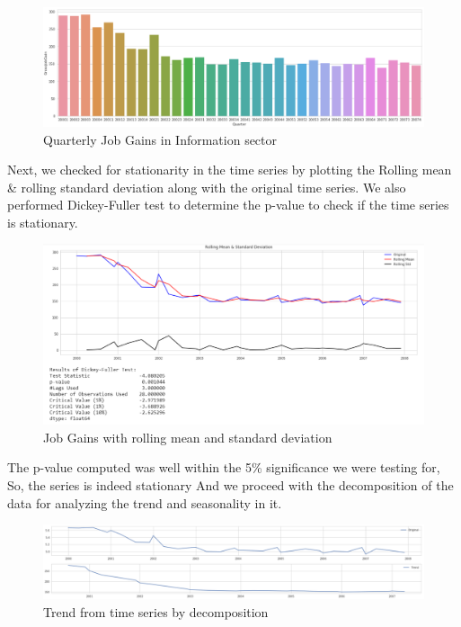 \documentclass[11pt,letterpaper]{article}
\begin{document}
\begin{figure}[h]
	\includegraphics[width=\linewidth]{"./pictures/jobgains"}
	\caption{Quarterly Job Gains in Information sector}
    \label{fig:Job Gains in Information sector}
\end{figure}

Next, we checked for stationarity in the time series by plotting the Rolling mean \& rolling standard deviation along with the original time series. We also performed Dickey-Fuller test to determine the p-value to check if the time series is stationary.

\begin{figure}[h]
	\includegraphics[width=\linewidth]{"./pictures/DF"}
	\caption{Job Gains with rolling mean and standard deviation}
    \label{fig:Dickey-Fuller on Job gains}
\end{figure}

The p-value computed was well within the 5\% significance we were testing for, So, the series is indeed stationary And we proceed with the decomposition of the data for analyzing the trend and seasonality in it.

\begin{figure}[h]
	\includegraphics[width=\linewidth]{"./pictures/trend"}
	\caption{Trend from time series by decomposition}
    \label{fig:Trend in job gains}
\end{figure}
\end{document}
